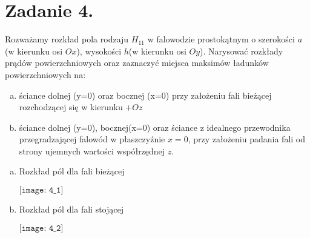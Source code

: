 \section*{Zadanie 4.}
\begin{task}
Rozważamy rozkład pola rodzaju $H_{11}$ w falowodzie prostokątnym o szerokości $a$(w kierunku osi $Ox$), wysokości $h$(w kierunku osi $Oy$). Narysować rozkłady prądów powierzchniowych oraz zaznaczyć miejsca maksimów ładunków powierzchniowych na:
\begin{enumerate}[a)]
\item ściance dolnej (y=0) oraz bocznej (x=0) przy założeniu fali bieżącej rozchodzącej się w kierunku $+Oz$
\item ściance dolnej (y=0), bocznej(x=0) oraz ściance z idealnego przewodnika przegradzającej falowód w płaszczyźnie $x=0$, przy założeniu padania fali od strony ujemnych wartości współrzędnej $z$.\\
\end{enumerate}
\end{task}

\begin{solution}

\begin{enumerate}[a)]
	\item Rozkład pól dla fali bieżącej 
	\begin{center}
	$\texttt{[image: 4\_1]}$
	\end{center}


\item Rozkład pól dla fali stojącej 
	\begin{center}
	$\texttt{[image: 4\_2]}$

	\end{center}

\end{enumerate}
\end{solution}